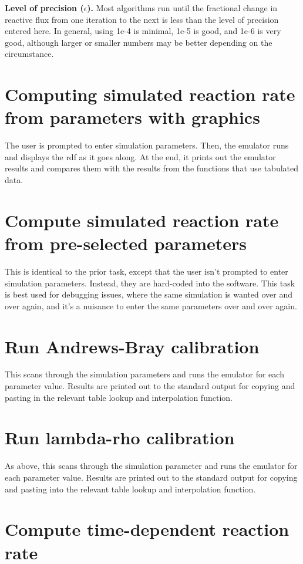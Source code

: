 \documentclass {book}
\begin{document}
\textbf{Level of precision ($\epsilon$).} Most algorithms run until the fractional change in reactive flux from one iteration to the next is less than the level of precision entered here. In general, using 1e-4 is minimal, 1e-5 is good, and 1e-6 is very good, although larger or smaller numbers may be better depending on the circumstance.


\section{Computing simulated reaction rate from parameters with graphics}

The user is prompted to enter simulation parameters. Then, the emulator runs and displays the rdf as it goes along. At the end, it prints out the emulator results and compares them with the results from the functions that use tabulated data.

\section{Compute simulated reaction rate from pre-selected parameters}

This is identical to the prior task, except that the user isn't prompted to enter simulation parameters. Instead, they are hard-coded into the software. This task is best used for debugging issues, where the same simulation is wanted over and over again, and it's a nuisance to enter the same parameters over and over again.

\section{Run Andrews-Bray calibration}

This scans through the simulation parameters and runs the emulator for each parameter value. Results are printed out to the standard output for copying and pasting in the relevant table lookup and interpolation function.

\section{Run lambda-rho calibration}

As above, this scans through the simulation parameter and runs the emulator for each parameter value. Results are printed out to the standard output for copying and pasting into the relevant table lookup and interpolation function.

\section{Compute time-dependent reaction rate}
\end{document}
